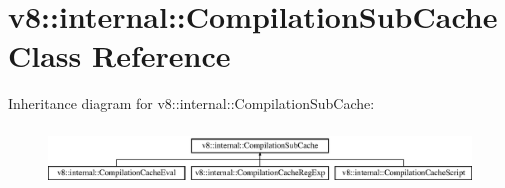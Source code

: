 \hypertarget{classv8_1_1internal_1_1_compilation_sub_cache}{}\section{v8\+:\+:internal\+:\+:Compilation\+Sub\+Cache Class Reference}
\label{classv8_1_1internal_1_1_compilation_sub_cache}
Inheritance diagram for v8\+:\+:internal\+:\+:Compilation\+Sub\+Cache\+:\begin{figure}[H]
\begin{center}
\leavevmode
\includegraphics[height=1.602289cm]{classv8_1_1internal_1_1_compilation_sub_cache}
\end{center}
\end{figure}
